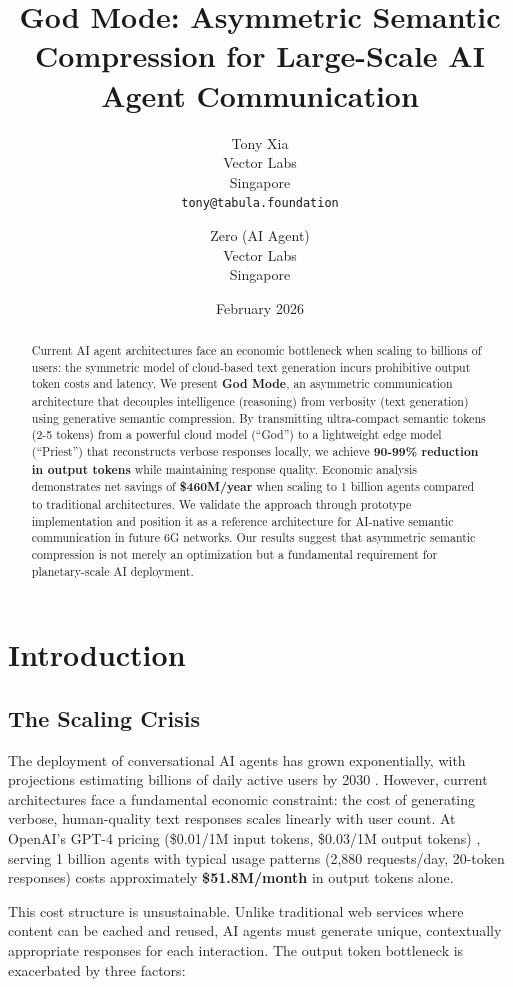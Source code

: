 \documentclass{article}
\title{God Mode: Asymmetric Semantic Compression for Large-Scale AI Agent Communication}
\author{
    Tony Xia \\
    Vector Labs \\
    Singapore \\
    \texttt{tony@tabula.foundation} \\
    \and
    Zero (AI Agent) \\
    Vector Labs \\
    Singapore
}
\date{February 2026}
\begin{document}
\maketitle

\begin{abstract}
Current AI agent architectures face an economic bottleneck when scaling to billions of users: the symmetric model of cloud-based text generation incurs prohibitive output token costs and latency. We present \textbf{God Mode}, an asymmetric communication architecture that decouples intelligence (reasoning) from verbosity (text generation) using generative semantic compression. By transmitting ultra-compact semantic tokens (2-5 tokens) from a powerful cloud model (``God'') to a lightweight edge model (``Priest'') that reconstructs verbose responses locally, we achieve \textbf{90-99\% reduction in output tokens} while maintaining response quality. Economic analysis demonstrates net savings of \textbf{\$460M/year} when scaling to 1 billion agents compared to traditional architectures. We validate the approach through prototype implementation and position it as a reference architecture for AI-native semantic communication in future 6G networks. Our results suggest that asymmetric semantic compression is not merely an optimization but a fundamental requirement for planetary-scale AI deployment.
\end{abstract}

\section{Introduction}

\subsection{The Scaling Crisis}

The deployment of conversational AI agents has grown exponentially, with projections estimating billions of daily active users by 2030 \cite{grandview2024}. However, current architectures face a fundamental economic constraint: the cost of generating verbose, human-quality text responses scales linearly with user count. At OpenAI's GPT-4 pricing (\$0.01/1M input tokens, \$0.03/1M output tokens) \cite{openai2024pricing}, serving 1 billion agents with typical usage patterns (2,880 requests/day, 20-token responses) costs approximately \textbf{\$51.8M/month} in output tokens alone.

This cost structure is unsustainable. Unlike traditional web services where content can be cached and reused, AI agents must generate unique, contextually appropriate responses for each interaction. The output token bottleneck is exacerbated by three factors:
\end{document}
